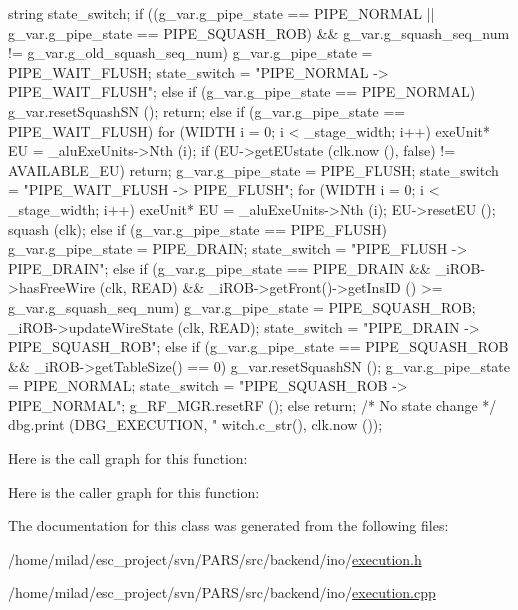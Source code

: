 \begin{DoxyCode}
                                         {
    string state_switch;
    if ((g_var.g_pipe_state == PIPE_NORMAL || g_var.g_pipe_state == 
      PIPE_SQUASH_ROB) && 
        g_var.g_squash_seq_num != g_var.g_old_squash_seq_num) {
        g_var.g_pipe_state = PIPE_WAIT_FLUSH;
        state_switch =  "PIPE_NORMAL -> PIPE_WAIT_FLUSH";
    } else if (g_var.g_pipe_state == PIPE_NORMAL) {
        g_var.resetSquashSN ();
        return;
    } else if (g_var.g_pipe_state == PIPE_WAIT_FLUSH) {
        for (WIDTH i = 0; i < _stage_width; i++) {
            exeUnit* EU = _aluExeUnits->Nth (i);
            if (EU->getEUstate (clk.now (), false) != AVAILABLE_EU) return;
        }
        g_var.g_pipe_state = PIPE_FLUSH;
        state_switch =  "PIPE_WAIT_FLUSH -> PIPE_FLUSH";
        for (WIDTH i = 0; i < _stage_width; i++) {
            exeUnit* EU = _aluExeUnits->Nth (i);
            EU->resetEU ();
        }
        squash (clk);
    } else if (g_var.g_pipe_state == PIPE_FLUSH) {
        g_var.g_pipe_state = PIPE_DRAIN;
        state_switch =  "PIPE_FLUSH -> PIPE_DRAIN";
    } else if (g_var.g_pipe_state == PIPE_DRAIN && _iROB->hasFreeWire (clk, READ)
       && 
               _iROB->getFront()->getInsID () >= g_var.g_squash_seq_num) {
        g_var.g_pipe_state = PIPE_SQUASH_ROB;
        _iROB->updateWireState (clk, READ);
        state_switch =  "PIPE_DRAIN -> PIPE_SQUASH_ROB";
    } else if (g_var.g_pipe_state == PIPE_SQUASH_ROB && _iROB->getTableSize() == 
      0) {
        g_var.resetSquashSN ();
        g_var.g_pipe_state = PIPE_NORMAL;
        state_switch =  "PIPE_SQUASH_ROB -> PIPE_NORMAL";
        g_RF_MGR.resetRF ();
    } else {
        return; /* No state change */
    }
    dbg.print (DBG_EXECUTION, "%
      witch.c_str(), clk.now ());
}
\end{DoxyCode}


Here is the call graph for this function:




Here is the caller graph for this function:




The documentation for this class was generated from the following files:\begin{DoxyCompactItemize}
\item 
/home/milad/esc\_\-project/svn/PARS/src/backend/ino/\hyperlink{ino_2execution_8h}{execution.h}\item 
/home/milad/esc\_\-project/svn/PARS/src/backend/ino/\hyperlink{ino_2execution_8cpp}{execution.cpp}\end{DoxyCompactItemize}
